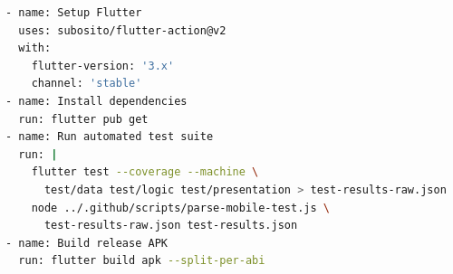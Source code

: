 \begin{figure}[t]
\centering
\fitfull{\figCicd}
\caption{}\label{fig:mobile_cicd}
\end{figure}

\begin{lstlisting}[language=bash, caption={\bi{Quy trình kiểm thử mobile trong GitHub Actions.}{Mobile CI step sequence in GitHub Actions.}}]
- name: Setup Flutter
  uses: subosito/flutter-action@v2
  with:
    flutter-version: '3.x'
    channel: 'stable'
- name: Install dependencies
  run: flutter pub get
- name: Run automated test suite
  run: |
    flutter test --coverage --machine \
      test/data test/logic test/presentation > test-results-raw.json
    node ../.github/scripts/parse-mobile-test.js \
      test-results-raw.json test-results.json
- name: Build release APK
  run: flutter build apk --split-per-abi
\end{lstlisting}
